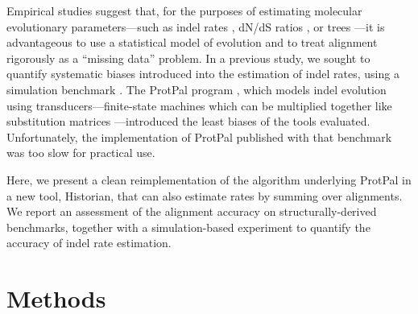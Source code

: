 Empirical studies suggest that, for the purposes of estimating
molecular evolutionary parameters---such as indel rates \citep{Westesson2012-zg},
dN/dS ratios \citep{Redelings2014},
or trees \citep{LoytynojaGoldman2008}---it is advantageous to use a statistical model of evolution
and to treat alignment rigorously as a ``missing data'' problem.
%
% 
In a previous study, we sought to quantify systematic biases introduced into the
estimation of indel rates, using a simulation benchmark \citep{Westesson2012-zg}.
The ProtPal program \citep{Westesson2012-zg}, which models indel evolution using 
transducers---finite-state machines which can be multiplied together like substitution matrices \citep{BouchardCote2013}---introduced
the least biases of the tools evaluated.
Unfortunately, the implementation of ProtPal published with that benchmark was too slow
for practical use.

Here, we present a clean reimplementation of the algorithm underlying ProtPal
in a new tool, Historian, that can also estimate rates by summing over alignments.
We report an assessment of the alignment accuracy
on structurally-derived benchmarks,
together with a simulation-based experiment to quantify the accuracy of indel rate estimation.

\section{Methods}

